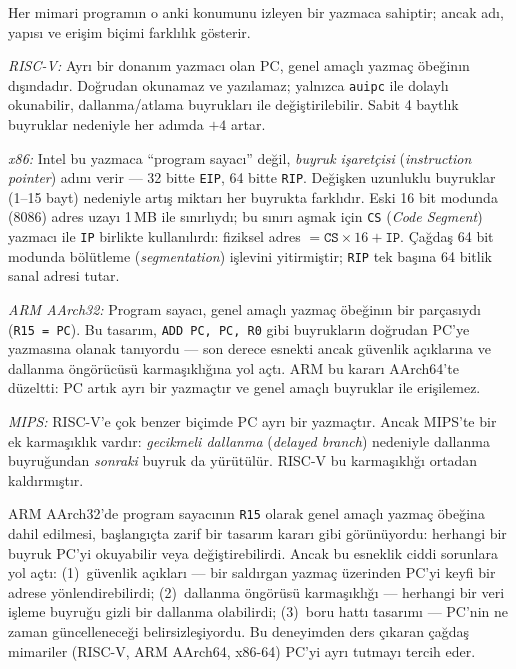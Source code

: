 \begin{karsilastirma}
Her mimari programın o anki konumunu izleyen bir yazmaca sahiptir; ancak adı, yapısı ve erişim biçimi farklılık gösterir.

\emph{RISC-V:} Ayrı bir donanım yazmacı olan PC, genel amaçlı yazmaç öbeğinın dışındadır. Doğrudan okunamaz ve yazılamaz; yalnızca \texttt{auipc} ile dolaylı okunabilir, dallanma/atlama buyrukları ile değiştirilebilir. Sabit 4 baytlık buyruklar nedeniyle her adımda $+4$ artar.

\emph{x86:} Intel bu yazmaca ``program sayacı'' değil, \emph{buyruk işaretçisi} (\emph{instruction pointer}) adını verir --- 32 bitte \texttt{EIP}, 64 bitte \texttt{RIP}. Değişken uzunluklu buyruklar (1--15 bayt) nedeniyle artış miktarı her buyrukta farklıdır. Eski 16 bit modunda (8086) adres uzayı 1\,MB ile sınırlıydı; bu sınırı aşmak için \texttt{CS} (\emph{Code Segment}) yazmacı ile \texttt{IP} birlikte kullanılırdı: fiziksel adres $= \texttt{CS} \times 16 + \texttt{IP}$. Çağdaş 64 bit modunda bölütleme (\emph{segmentation}) işlevini yitirmiştir; \texttt{RIP} tek başına 64 bitlik sanal adresi tutar.

\emph{ARM AArch32:} Program sayacı, genel amaçlı yazmaç öbeğinın bir parçasıydı (\texttt{R15 = PC}). Bu tasarım, \texttt{ADD PC, PC, R0} gibi buyrukların doğrudan PC'ye yazmasına olanak tanıyordu --- son derece esnekti ancak güvenlik açıklarına ve dallanma öngörücüsü karmaşıklığına yol açtı. ARM bu kararı AArch64'te düzeltti: PC artık ayrı bir yazmaçtır ve genel amaçlı buyruklar ile erişilemez.

\emph{MIPS:} RISC-V'e çok benzer biçimde PC ayrı bir yazmaçtır. Ancak MIPS'te bir ek karmaşıklık vardır: \emph{gecikmeli dallanma} (\emph{delayed branch}) nedeniyle dallanma buyruğundan \emph{sonraki} buyruk da yürütülür. RISC-V bu karmaşıklığı ortadan kaldırmıştır.
\end{karsilastirma}

\begin{bilginot}
ARM AArch32'de program sayacının \texttt{R15} olarak genel amaçlı yazmaç öbeğina dahil edilmesi, başlangıçta zarif bir tasarım kararı gibi görünüyordu: herhangi bir buyruk PC'yi okuyabilir veya değiştirebilirdi. Ancak bu esneklik ciddi sorunlara yol açtı: (1)~güvenlik açıkları --- bir saldırgan yazmaç üzerinden PC'yi keyfi bir adrese yönlendirebilirdi; (2)~dallanma öngörüsü karmaşıklığı --- herhangi bir veri işleme buyruğu gizli bir dallanma olabilirdi; (3)~boru hattı tasarımı --- PC'nin ne zaman güncelleneceği belirsizleşiyordu. Bu deneyimden ders çıkaran çağdaş mimariler (RISC-V, ARM AArch64, x86-64) PC'yi ayrı tutmayı tercih eder.
\end{bilginot}

